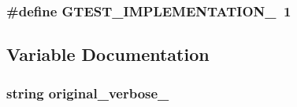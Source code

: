 \subsubsection[{\texorpdfstring{G\+T\+E\+S\+T\+\_\+\+I\+M\+P\+L\+E\+M\+E\+N\+T\+A\+T\+I\+O\+N\+\_\+}{GTEST_IMPLEMENTATION_}}]{\setlength{\rightskip}{0pt plus 5cm}\#define G\+T\+E\+S\+T\+\_\+\+I\+M\+P\+L\+E\+M\+E\+N\+T\+A\+T\+I\+O\+N\+\_\+~1}\hypertarget{gmock-internal-utils__test_8cc_a83bd232fd1077579fada92c31bb7469f}{}\label{gmock-internal-utils__test_8cc_a83bd232fd1077579fada92c31bb7469f}


\subsection{Variable Documentation}
\subsubsection[{\texorpdfstring{original\+\_\+verbose\+\_\+}{original_verbose_}}]{\setlength{\rightskip}{0pt plus 5cm}string original\+\_\+verbose\+\_\+\hspace{0.3cm}{\ttfamily [protected]}}\hypertarget{gmock-internal-utils__test_8cc_a012736b03d0c8d916dfc1884f4817504}{}\label{gmock-internal-utils__test_8cc_a012736b03d0c8d916dfc1884f4817504}
